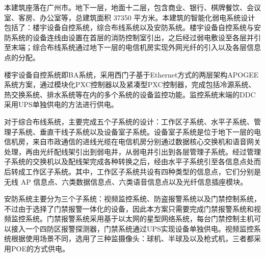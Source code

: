 \documentclass{gdutart}
\begin{document}
  \nocite{*}

  \pagestyle{empty}

  \begin{cabstract} 本建筑座落在广州市。地下一层，地面十二层，包含商业、银行、棋牌餐饮、会议室、客房、办公室等，总建筑面积 37350 平方米。本建筑的智能化弱电系统设计包括了：楼宇设备自控系统，综合布线系统以及安防系统。楼宇设备自控系统与安防系统的设备连线由设置在首层的消防控制室引出，之后经过弱电敷设至各层并引至末端；综合布线系统通过地下一层的电信机房实现外网光纤的引入以及各层信息点的分配。

  楼宇设备自控系统即BA系统，采用西门子基于Ethernet方式的两层架构APOGEE系统方案，通过模块化PXC控制器以及紧凑型PXC控制器，完成包括冷源系统、热交换系统、排水系统等在内的多个系统的设备监控功能。监控系统末端的DDC采用UPS单独供电的方法进行供电。

  对于综合布线系统，主要完成五个子系统的设计：工作区子系统、水平子系统、管理子系统、垂直干线子系统以及设备室子系统。设备室子系统是位于地下一层的电信机房，来自市政通信的进线光缆在电信机房分别通过数据核心交换机和语音网关处理，再由光纤配线架引出到弱电井，从弱电井引出到各层管理子系统。经过管理子系统的交换机以及配线架完成各种转换之后，经由水平子系统引至各信息点处而后转成工作区子系统。其中，工作区子系统共设有四种类型的信息点，它们分别是无线 AP 信息点、六类数据信息点、六类语音信息点以及光纤信息插座模块。

  安防系统主要分为三个子系统：视频监控系统、防盗报警系统以及门禁控制系统，不过由于选择了门禁报警一体化的设备，因此本方案只需要完成门禁报警系统和视频监控系统。门禁报警系统采用基于以太网的星型网络系统，每台门禁控制主机可以接入一个四防区报警探测器，门禁系统通过UPS实现设备单独供电。视频监控系统根据使用场景不同，选用了三种监摄像头：球机、半球及以及枪式机，三者都采用POE的方式供电。
  \end{cabstract}
  \clearpage
\end{document}
